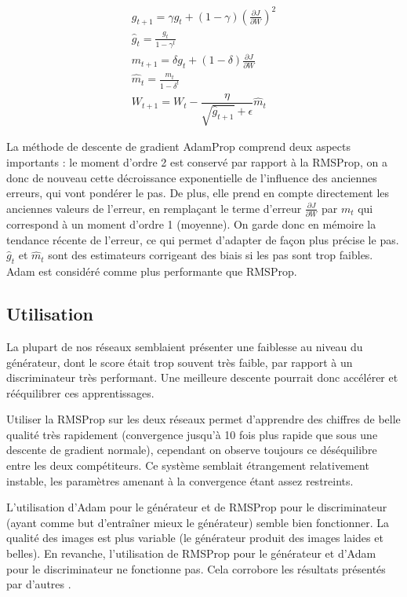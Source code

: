 \begin{equation} 
\begin{aligned}
g_{t+1} = \gamma g_t + (1-\gamma)(\frac{\partial J}{\partial W})^2  \\
\hat{g}_{t} = \frac{g_{t} }{1 - \gamma^t} \\
m_{t+1} = \delta g_t + (1-\delta)\frac{\partial J}{\partial W}   \\
\hat{m}_{t} = \frac{m_{t} }{1 - \delta^t} \\
W_{t+1} = W_t - \dfrac{\eta}{\sqrt{\hat{g}_{t+1}} + \epsilon}\hat{m}_{t}
\end{aligned}
\end{equation} 

La méthode de descente de gradient AdamProp comprend deux aspects importants : le moment d'ordre 2 est conservé par rapport à la RMSProp, on a donc de nouveau cette décroissance exponentielle de l'influence des anciennes erreurs, qui vont pondérer le pas. De plus, elle prend en compte directement les anciennes valeurs de l'erreur, en remplaçant le terme d'erreur $\frac{\partial J}{\partial W}$ par $m_{t}$ qui correspond à un moment d'ordre 1 (moyenne). On garde donc en mémoire la tendance récente de l'erreur, ce qui permet d'adapter de façon plus précise le pas.
$\hat{g}_{t}$ et $\hat{m}_{t}$ sont des estimateurs corrigeant des  biais si les pas sont trop faibles.
Adam est considéré comme plus performante que RMSProp. 

\subsection{Utilisation}

La plupart de nos réseaux semblaient présenter une faiblesse au niveau du générateur, dont le score était trop souvent très faible, par rapport à un discriminateur très performant. Une meilleure descente pourrait donc accélérer et rééquilibrer ces apprentissages. 

Utiliser la RMSProp sur les deux réseaux permet d'apprendre des chiffres de belle qualité très rapidement (convergence jusqu'à 10 fois plus rapide que sous une descente de gradient normale), cependant on observe toujours ce déséquilibre entre les deux compétiteurs. Ce système semblait étrangement relativement instable, les paramètres amenant à la convergence étant assez restreints.

L’utilisation d’Adam pour le générateur et de RMSProp pour le discriminateur (ayant comme but d'entraîner mieux le générateur) semble bien fonctionner. La qualité des images est plus variable (le générateur produit des images laides et belles).
En revanche, l'utilisation de RMSProp pour le générateur et d'Adam pour le discriminateur ne fonctionne pas. Cela corrobore les résultats présentés par d'autres \cite{auriau_apprentissage_2017}.

